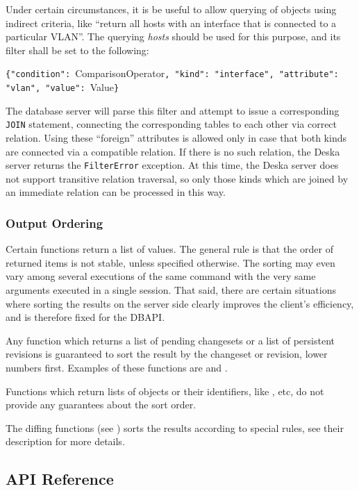 \documentclass[deska]{subfiles}
\begin{document}
Under certain circumstances, it is be useful to allow querying of objects using indirect criteria, like ``return all
hosts with an interface that is connected to a particular VLAN''.  The  querying {\em
hosts} should be used for this purpose, and its filter shall be set to the following:

{\tt \{"condition": }ComparisonOperator{\tt, "kind": "interface", "attribute": "vlan", "value": }Value{\tt \}}

The database server will parse this filter and attempt to issue a corresponding {\tt JOIN} statement, connecting the
corresponding tables to each other via correct relation.  Using these ``foreign'' attributes is allowed only in case
that both kinds are connected via a compatible relation.  If there is no such relation, the Deska server returns the
{\tt FilterError} exception.  At this time, the Deska server does not support transitive relation traversal, so only
those kinds which are joined by an immediate relation can be processed in this way.

\subsubsection{Output Ordering}

Certain functions return a list of values.  The general rule is that the order of returned items is not stable, unless
specified otherwise.  The sorting may even vary among several executions of the same command with the very same
arguments executed in a single session.  That said, there are certain situations where sorting the results on the server
side clearly improves the client's efficiency, and is therefore fixed for the DBAPI.

Any function which returns a list of pending changesets or a list of persistent revisions is guaranteed to sort the
result by the changeset or revision, lower numbers first.  Examples of these functions are 
and .

Functions which return lists of objects or their identifiers, like ,
 etc, do not provide any guarantees about the sort order.

The diffing functions (see ) sorts the results according to special rules, see their
description for more details.

\subsection{API Reference}
\label{sec:api-ref}
\end{document}
